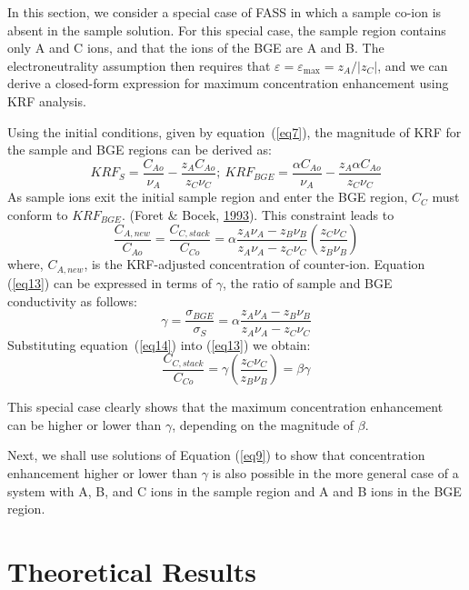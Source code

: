 \documentclass[lineno,authoryear]{FLO_v1}%
\theoremstyle{definition}
\begin{document}
In this section, we consider a special case of FASS in
which a sample co-ion is absent in the sample solution. For
this special case, the sample region contains only A and C
ions, and that the ions of the BGE are A and B. The
electroneutrality assumption then requires that
$\varepsilon =\varepsilon_{\max}=z_A/|z_C|$, and we can
derive a closed-form expression for maximum concentration
enhancement using KRF analysis.

Using the initial conditions, given by
equation~(\ref{eq7}), the magnitude of KRF for the sample
and BGE regions can be derived as:
\begin{equation}\label{eq12}
KRF_S =\frac{C_{Ao} }{\nu _A }-\frac{z_A C_{Ao} }{z_C \nu_C };\
KRF_{BGE} =\frac{\alpha C_{Ao}}{\nu_A}-\frac{z_A\alpha C_{Ao}}{z_C \nu_C}
\end{equation}
As sample ions exit the initial sample region and enter the
BGE region, $C_{C}$ must conform to
$\textit{KRF}_{\textit{BGE}}$. (Foret \& Bocek,
\hyperlink{bib8}{1993}). This constraint leads to
\begin{equation}\label{eq13}
\frac{C_{A,new} }{C_{Ao} }=\frac{C_{C,stack} }{C_{Co}}=\alpha \frac{z_A \nu _A -z_B \nu _B }{z_A \nu _A -z_C \nu
_C }\left( {\frac{z_C \nu _C }{z_B \nu _B}} \right)
\end{equation}
where, $C_{A,new}$, is the KRF-adjusted concentration of
counter-ion. Equation (\ref{eq13}) can be expressed in
terms of $\gamma$, the ratio of sample and BGE conductivity
as follows:
\begin{equation}\label{eq14}
\gamma =\frac{\sigma _{BGE} }{\sigma _S }=\alpha \frac{z_A \nu _A -z_B \nu _B }{z_A \nu _A -z_C \nu _C }
\end{equation}
Substituting equation~(\ref{eq14}) into (\ref{eq13}) we
obtain:
\begin{equation}\label{eq15}
\frac{C_{C,stack} }{C_{Co} }=\gamma \left( {\frac{z_C \nu _C }{z_B \nu _B }} \right)=\beta \gamma
\end{equation}

This special case clearly shows that the maximum
concentration enhancement can be higher or lower than
$\gamma$, depending on the magnitude of $\beta$.

Next, we shall use solutions of Equation (\ref{eq9}) to
show that concentration enhancement higher or lower than
$\gamma$ is also possible in the more general case of a
system with A, B, and C ions in the sample region and A and
B ions in the BGE region.

\section{Theoretical Results}
\end{document}
